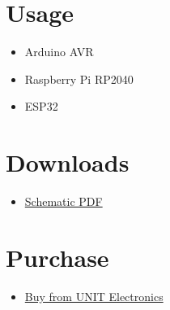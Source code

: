\documentclass[10pt]{article}
\begin{document}
\section*{Usage}
\begin{itemize}
\item Arduino AVR
\item Raspberry Pi RP2040
\item ESP32
\end{itemize}

\section*{Downloads}
\begin{itemize}
\begin{itemize}
\item \href{../hardware/}{Schematic PDF}
\end{itemize}
\end{itemize}

\section*{Purchase}
\begin{itemize}
\item \href{https://www.uelectronics.com}{Buy from UNIT Electronics}
\end{itemize}
\end{document}
